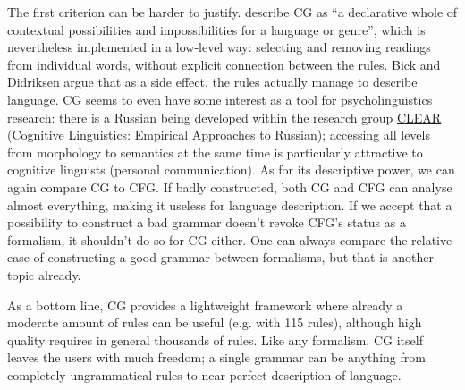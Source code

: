 The first criterion can be harder to justify. \cite{bick2015} describe CG as ``a
declarative whole of contextual possibilities and impossibilities for
a language or genre'', which is nevertheless implemented in a
low-level way: selecting and removing readings from individual words,
without explicit connection between the rules. Bick and Didriksen
argue that as a side effect, the rules actually manage to describe language.
CG seems to even have some interest as a tool for psycholinguistics research:
there is a Russian being developed within the research group
 \href{https://uit.no/forskning/forskningsgrupper/gruppe?p_document_id=344365}{CLEAR
} (Cognitive Linguistics: Empirical Approaches to Russian); accessing
all levels from morphology to semantics at the same time is particularly attractive to cognitive linguists (personal communication).
As for its descriptive power, we can again compare CG to CFG. If
badly constructed, both CG and CFG can analyse almost everything,
making it useless for language description. If we accept that a
possibility to construct a bad grammar doesn't revoke CFG's status as
a formalism, it shouldn't do so for CG either. One can always compare
the relative ease of constructing a good grammar between formalisms,
but that is another topic already.

As a bottom line, CG provides a lightweight framework where already a
moderate amount of rules can be useful (e.g. \cite{lene_trond2011} with 115
rules), although high quality requires in general thousands of rules.
Like any formalism, CG itself leaves the users with much freedom; a
single grammar can be anything from completely ungrammatical rules to near-perfect description of language.







